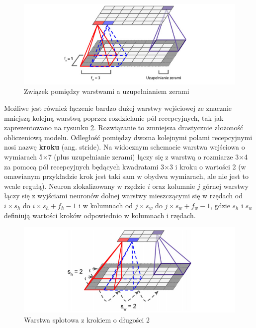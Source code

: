 \documentclass[12pt]{mwbk}
\theoremstyle{plain}
\theoremstyle{definition}
\theoremstyle{remark}
\newcommand\zrodlo[1]{\par\vspace{-3mm}{\small\textit{Źródło: }#1 }}
\begin{document}
\begin{figure}[!h]
	\centering
	\includegraphics[width=\linewidth]{rys/zero_padding.png}
	\caption{Związek pomiędzy warstwami a uzupełnianiem zerami}
	\zrodlo{\cite{geron}}
	\label{fig:zero-padding}
\end{figure}

Możliwe jest również łączenie bardzo dużej warstwy wejściowej ze znacznie mniejszą kolejną warstwą
poprzez rozdzielanie pól recepcyjnych, tak jak zaprezentowano na rysunku \ref{fig:stride}. Rozwiązanie to
zmniejsza drastycznie złożoność obliczeniową modelu. Odległość pomiędzy dwoma kolejnymi polami
recepcyjnymi nosi nazwę \textbf{kroku} (ang. stride). Na widocznym schemacie warstwa wejściowa o wymiarach 5×7 (plus uzupełnianie zerami) łączy się z warstwą o rozmiarze 3×4 za pomocą pól recepcyjnych będących kwadratami 3×3 i kroku o wartości 2 (w omawianym przykładzie krok jest taki sam w obydwu wymiarach, ale nie jest to wcale regułą). Neuron zlokalizowany w rzędzie $i$ oraz kolumnie $j$ górnej warstwy łączy się z wyjściami neuronów dolnej warstwy mieszczącymi się w rzędach od $i\times s_h$ do $i\times s_h +f_h -1$ i w kolumnach od $j\times s_w$ do $j \times s_w +f_w -1$, gdzie $s_h$ i $s_w$ definiują wartości kroków odpowiednio w kolumnach i rzędach.


\begin{figure}[!h]
	\centering
	\includegraphics[width=0.9\linewidth]{rys/cnn_stride.png}
	\caption{Warstwa splotowa z krokiem o długości 2}
	\zrodlo{\cite{geron}}
	\label{fig:stride}
\end{figure}
\end{document}
